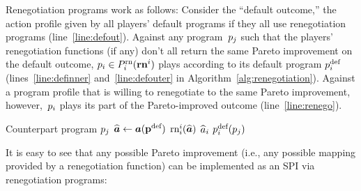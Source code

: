 \documentclass[sigconf]{aamas}
\theoremstyle{definition}
\begin{document}
Renegotiation programs work as follows:
Consider the ``default outcome,'' the action profile
given by all players' default programs if they all use renegotiation programs (line~\ref{line:defout}).
Against any program~$p_j$
such that
the players' renegotiation functions (if any) don't all return the same Pareto improvement
on the default outcome,
$\progi \in \onefsspacei(\smrenegi)$ plays according to its
default program $\defprogi$ (lines~\ref{line:definner} and~\ref{line:defouter} in Algorithm~\ref{alg:renegotiation}).
Against a program profile
that is willing to renegotiate
to the same Pareto improvement,
however,~$p_i$ plays
its part of the Pareto-improved outcome (line~\ref{line:renego}).

\begin{algorithm}
\caption{Renegotiation program $\progi \in \onefsspacei(\smrenegi)$, for some $\defprogi$}
\label{alg:renegotiation}
\begin{algorithmic}[1]
\Require Counterpart program $p_j$
  
    \State $\widehat{\boldsymbol{a}} \leftarrow \boldsymbol{a}({\textbf{p}}^{\textnormal{def}})$
    \label{line:defout}
        \State \Return $\textnormal{rn}_i^{i}(\widehat{\boldsymbol{a}})$
         \label{line:renego}
    \Else
         \State \Return 
         $\widehat{a}_i$
         \label{line:definner}
    \EndIf
\Else
     \State \Return $p_i^{\textnormal{def}}(p_j)$  
     \label{line:defouter}
\EndIf
\end{algorithmic}
\end{algorithm}

It is easy to see that any 
possible Pareto improvement
(i.e., any possible mapping provided by a
renegotiation function)
can be implemented as an SPI via renegotiation programs:
\end{document}
